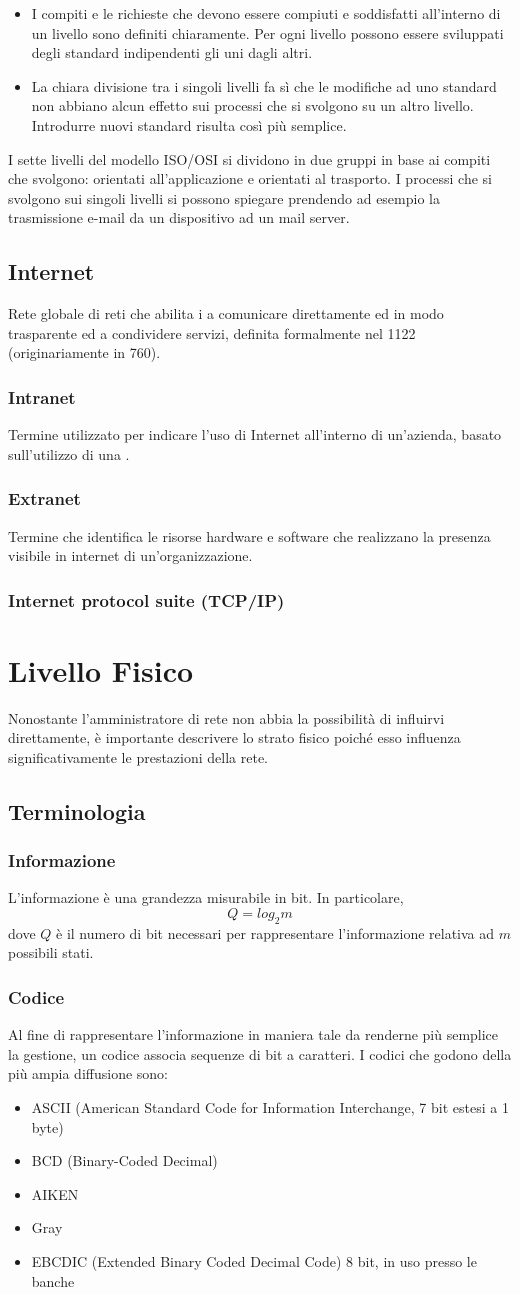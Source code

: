 \documentclass[a4paper,11pt]{article}
\def\sec#1{\section{#1}\label{#1}}
\def\sub#1{\subsection{#1}\label{#1}}
\def\subsub#1{\subsubsection{#1}\label{#1}}
\def\vedi#1{\nameref{#1}}
\begin{document}
\begin{itemize}
	\item I compiti e le richieste che devono essere compiuti e soddisfatti all’interno di un livello sono definiti chiaramente. Per ogni livello possono essere sviluppati degli standard indipendenti gli uni dagli altri.
	\item La chiara divisione tra i singoli livelli fa sì che le modifiche ad uno standard non abbiano alcun effetto sui processi che si svolgono su un altro livello. Introdurre nuovi standard risulta così più semplice.
\end{itemize}
I sette livelli del modello ISO/OSI si dividono in due gruppi in base ai compiti che svolgono: orientati all’applicazione e orientati al trasporto. I processi che si svolgono sui singoli livelli si possono spiegare prendendo ad esempio la trasmissione e-mail da un dispositivo ad un mail server.

\sub{Internet}
Rete globale di reti che abilita i \vedi{DTE} a comunicare direttamente ed in modo trasparente ed a condividere servizi, definita formalmente nel \vedi{RFC}1122 (originariamente in \vedi{RFC}760).

\subsub{Intranet}
Termine utilizzato per indicare l'uso di Internet all'interno di un'azienda, basato sull'utilizzo di una \vedi{LAN}.

\subsub{Extranet}
Termine che identifica le risorse hardware e software che realizzano la presenza visibile in internet di un'organizzazione.

\subsub{Internet protocol suite (TCP/IP)}

\newpage

\sec{Livello Fisico}
Nonostante l'amministratore di rete non abbia la possibilità di influirvi direttamente, è importante descrivere lo strato fisico poiché esso influenza significativamente le prestazioni della rete.

\subsection{Terminologia}
\subsub{Informazione} 
L'informazione è una grandezza misurabile in bit. In particolare, \[Q=log_{2}m\] dove $Q$ è il numero di bit necessari per rappresentare l'informazione relativa ad $m$ possibili stati.

\subsub{Codice}
Al fine di rappresentare l'informazione in maniera tale da renderne più semplice la gestione, un codice associa sequenze di bit a caratteri. I codici che godono della più ampia diffusione sono:
\begin{itemize}
\item ASCII (American Standard Code for Information Interchange, 7 bit estesi a 1 byte)
\item BCD (Binary-Coded Decimal)
\item AIKEN 
\item Gray
\item EBCDIC (Extended Binary Coded Decimal Code) 8 bit, in uso presso le banche
\end{itemize}
\end{document}
